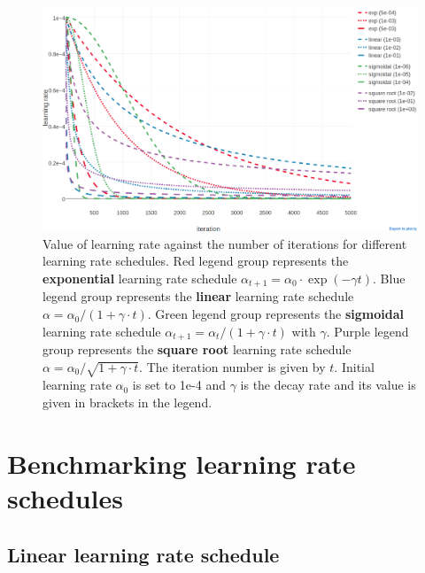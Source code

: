 \documentclass[12pt,a4paper,twoside]{book}
\theoremstyle{definition}
\theoremstyle{definition}
\theoremstyle{remark}
\begin{document}
\begin{figure}

{\centering \includegraphics[width=1\linewidth]{img/full_likelihood/appendix/learning_rate_schedules_alpha0_1e-4_notitle} 

}

\caption{Value of learning rate against the
number of iterations for different learning rate schedules. Red legend
group represents the \textbf{exponential} learning rate schedule
\(\alpha_{t+1} = \alpha_0 \cdot\exp(- \gamma t)\). Blue legend group
represents the \textbf{linear} learning rate schedule
\(\alpha = \alpha_0 / (1 + \gamma \cdot t)\). Green legend group
represents the \textbf{sigmoidal} learning rate schedule
\(\alpha_{t+1} = \alpha_{t} / (1 + \gamma \cdot t)\) with \(\gamma\).
Purple legend group represents the \textbf{square root} learning rate
schedule \(\alpha = \alpha_0 / \sqrt{1 + \gamma \cdot t}\). The
iteration number is given by \(t\). Initial learning rate \(\alpha_0\)
is set to 1e-4 and \(\gamma\) is the decay rate and its value is given
in brackets in the legend.}\label{fig:learning-rate-schedules}
\end{figure}

\section{Benchmarking learning rate
schedules}\label{benchmark-learning-rate-annealing-schedules}

\subsection{Linear learning rate
schedule}\label{linear-learning-rate-schedule}
\end{document}
